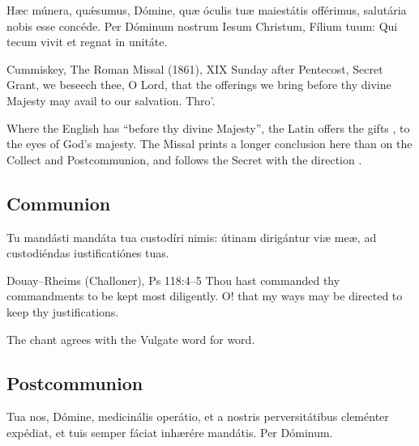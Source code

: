 
\begin{latinproper}
Hæc múnera, quǽsumus, Dómine, quæ óculis tuæ maiestátis offérimus, salutária
nobis esse concéde. Per Dóminum nostrum Iesum Christum, Fílium tuum: Qui tecum
vivit et regnat in unitáte.
\end{latinproper}

\begin{englishwitness}{Cummiskey, The Roman Missal (1861), XIX Sunday after Pentecost, Secret}
Grant, we beseech thee, O Lord, that the offerings we bring before thy divine
Majesty may avail to our salvation. Thro'.
\end{englishwitness}

\noindent Where the English has ``before thy divine Majesty'', the Latin offers
the gifts , to the eyes of God's majesty. The
Missal prints a longer conclusion here than on the Collect and Postcommunion,
and follows the Secret with the direction .

\subsection{Communion}
\label{proper-communion}


\begin{latinproper}
Tu mandásti mandáta tua custodíri nimis: útinam dirigántur viæ meæ, ad
custodiéndas iustificatiónes tuas.
\end{latinproper}

\begin{englishwitness}{Douay--Rheims (Challoner), Ps 118:4--5}
Thou hast commanded thy commandments to be kept most diligently. O! that my
ways may be directed to keep thy justifications.
\end{englishwitness}

\noindent The chant agrees with the Vulgate word for word.

\subsection{Postcommunion}
\label{proper-postcommunion}


\begin{latinproper}
Tua nos, Dómine, medicinális operátio, et a nostris perversitátibus cleménter
expédiat, et tuis semper fáciat inhærére mandátis. Per Dóminum.
\end{latinproper}

